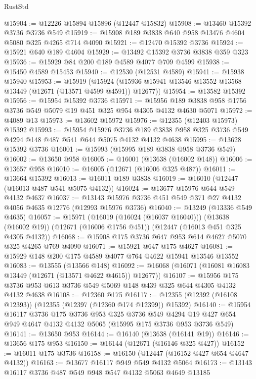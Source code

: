 \begin{lexlean}{RustStd}
\begin{coremodule}
@15904 := @12226 @15894 @15896 (@12447 @15832)
@15908 := @13460 @15392 @3736 @3736 @549
@15919 := @15908 @189 @3838 @640 @958 @13476 @4604 @5080 @325 @4265 @714 @4090
@15921 := @12470 @15392 @3736
@15924 := @15921 @640 @189 @4604
@15929 := @13492 @15392 @3736 @3838 @359 @323
@15936 := @15929 @84 @200 @189 @4589 @4077 @709 @4599
@15938 := @15450 @4589 @15453
@15940 := @12530 (@12531 @4589)
@15941 := @15938 @15940
@15953 := @15919
    (@15924 (@15936 @15941 @13546 @13552 @13568 @13449 (@12671 (@13571 @4599 @4591)) @12677))
@15954 := @13582 @15392
@15956 := @15954 @15392 @3736
@15971 := @15956 @189 @3838 @958 @1756 @3736 @549 @5079 @19 @451 @325 @954 @4305 @4132 @4630 @5071
@15972 := @4089 @13
@15973 := @13602 @15972
@15976 := @12355 (@12403 @15973) @15392
@15993 := @15954
    @15976
    @3736
    @189
    @3838
    @958
    @325
    @3736
    @549
    @4294
    @148
    @487
    @541
    @644
    @5075
    @4132
    @4132
    @4638
@15995 := @13628 @15392 @3736
@16001 := @15993 (@15995 @189 @3838 @958 @3736 @549)
@16002 := @13650 @958
@16005 := @16001 (@13638 (@16002 @148))
@16006 := @13657 @958
@16010 := @16005 (@12671 (@16006 @325 @487))
@16011 := @13664 @15392
@16013 := @16011 @189 @3838
@16019 := @16010 (@12447 (@16013 @487 @541 @5075 @4132))
@16024 := @13677 @15976 @644 @549 @4132 @4637
@16037 := @13143 @15976 @3736 @451 @549 @371 @27 @4132 @4056 @4635 @12776 (@12993 @15976 @3736)
@16040 := @13249 (@13336 @549 @4635)
@16057 := @15971
    (@16019 (@16024 (@16037 @16040)))
    (@13638 (@16002 @19))
    (@12671 (@16006 @1756 @451))
    (@12447 (@16013 @451 @325 @4305 @4132))
@16068 := @15908 @175 @3736 @647 @953 @614 @4627 @5070 @325 @4265 @769 @4090
@16071 := @15921 @647 @175 @4627
@16081 := @15929 @148 @200 @175 @4589 @4077 @764 @4622 @15941 @13546 @13552
@16083 := @13555 (@13566 @148)
@16092 := @16068 (@16071 (@16081 @16083 @13449 (@12671 (@13571 @4622 @4615)) @12677))
@16107 := @15956 @175 @3736 @953 @613 @3736 @549 @5069 @148 @439 @325 @644 @4305 @4132 @4132 @4638
@16108 := @12360 @175
@16117 := @12355 (@12392 (@16108 @12393)) (@12355 (@12397 (@12360 @174 @12399)) @15392)
@16140 := @15954
    @16117
    @3736
    @175
    @3736
    @953
    @325
    @3736
    @549
    @4294
    @19
    @427
    @654
    @949
    @4647
    @4132
    @4132
    @5065
    (@15995 @175 @3736 @953 @3736 @549)
@16141 := @13650 @953
@16144 := @16140 (@13638 (@16141 @19))
@16146 := @13656 @175 @953
@16150 := @16144 (@12671 (@16146 @325 @427))
@16152 := @16011 @175 @3736
@16158 := @16150 (@12447 (@16152 @427 @654 @4647 @4132))
@16163 := @13677 @16117 @949 @549 @4132 @5064
@16173 := @13143 @16117 @3736 @487 @549 @948 @547 @4132 @5063 @4649 @13185

\end{coremodule}
\end{lexlean}
